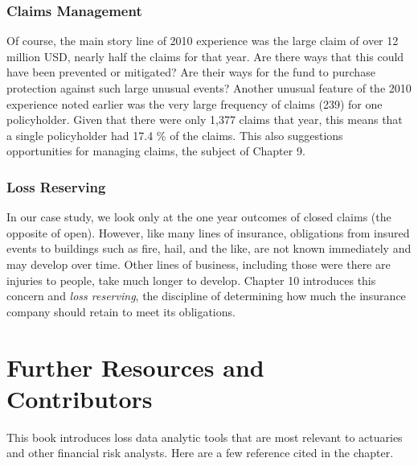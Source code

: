 \documentclass[]{book}
\begin{document}
\subsubsection*{Claims Management}\label{claims-management}

Of course, the main story line of 2010 experience was the large claim of
over 12 million USD, nearly half the claims for that year. Are there
ways that this could have been prevented or mitigated? Are their ways
for the fund to purchase protection against such large unusual events?
Another unusual feature of the 2010 experience noted earlier was the
very large frequency of claims (239) for one policyholder. Given that
there were only 1,377 claims that year, this means that a single
policyholder had 17.4 \% of the claims. This also suggestions
opportunities for managing claims, the subject of Chapter 9.

\subsubsection*{Loss Reserving}\label{loss-reserving}

In our case study, we look only at the one year outcomes of closed
claims (the opposite of open). However, like many lines of insurance,
obligations from insured events to buildings such as fire, hail, and the
like, are not known immediately and may develop over time. Other lines
of business, including those were there are injuries to people, take
much longer to develop. Chapter 10 introduces this concern and
\emph{loss reserving}, the discipline of determining how much the
insurance company should retain to meet its obligations.

\section{Further Resources and
Contributors}\label{further-reading-and-resources}

This book introduces loss data analytic tools that are most relevant to
actuaries and other financial risk analysts. Here are a few reference
cited in the chapter.
\end{document}
